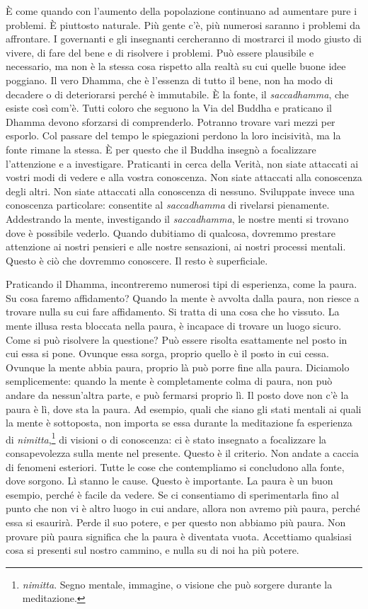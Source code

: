 È come quando con l'aumento della popolazione continuano ad aumentare
pure i problemi. È piuttosto naturale. Più gente c'è, più numerosi
saranno i problemi da affrontare. I governanti e gli insegnanti
cercheranno di mostrarci il modo giusto di vivere, di fare del bene e di
risolvere i problemi. Può essere plausibile e necessario, ma non è la
stessa cosa rispetto alla realtà su cui quelle buone idee poggiano. Il
vero Dhamma, che è l'essenza di tutto il bene, non ha modo di decadere o
di deteriorarsi perché è immutabile. È la fonte, il \emph{saccadhamma},
che esiste così com'è. Tutti coloro che seguono la Via del Buddha e
praticano il Dhamma devono sforzarsi di comprenderlo. Potranno trovare
vari mezzi per esporlo. Col passare del tempo le spiegazioni perdono la
loro incisività, ma la fonte rimane la stessa. È per questo che il
Buddha insegnò a focalizzare l'attenzione e a investigare. Praticanti in
cerca della Verità, non siate attaccati ai vostri modi di vedere e alla
vostra conoscenza. Non siate attaccati alla conoscenza degli altri. Non
siate attaccati alla conoscenza di nessuno. Sviluppate invece una
conoscenza particolare: consentite al \emph{saccadhamma} di rivelarsi
pienamente. Addestrando la mente, investigando il \emph{saccadhamma}, le
nostre menti si trovano dove è possibile vederlo. Quando dubitiamo di
qualcosa, dovremmo prestare attenzione ai nostri pensieri e alle nostre
sensazioni, ai nostri processi mentali. Questo è ciò che dovremmo
conoscere. Il resto è superficiale.

Praticando il Dhamma, incontreremo numerosi tipi di esperienza, come la
paura. Su cosa faremo affidamento? Quando la mente è avvolta dalla
paura, non riesce a trovare nulla su cui fare affidamento. Si tratta di
una cosa che ho vissuto. La mente illusa resta bloccata nella paura, è
incapace di trovare un luogo sicuro. Come si può risolvere la questione?
Può essere risolta esattamente nel posto in cui essa si pone. Ovunque
essa sorga, proprio quello è il posto in cui cessa. Ovunque la mente
abbia paura, proprio là può porre fine alla paura. Diciamolo
semplicemente: quando la mente è completamente colma di paura, non può
andare da nessun'altra parte, e può fermarsi proprio lì. Il posto dove
non c'è la paura è lì, dove sta la paura. Ad esempio, quali che siano
gli stati mentali ai quali la mente è sottoposta, non importa se essa
durante la meditazione fa esperienza di \emph{nimitta},\footnote{\emph{nimitta}.
  Segno mentale, immagine, o visione che può sorgere durante la
  meditazione.} di visioni o di conoscenza: ci è stato insegnato a
focalizzare la consapevolezza sulla mente nel presente. Questo è il
criterio. Non andate a caccia di fenomeni esteriori. Tutte le cose che
contempliamo si concludono alla fonte, dove sorgono. Lì stanno le cause.
Questo è importante. La paura è un buon esempio, perché è facile da
vedere. Se ci consentiamo di sperimentarla fino al punto che non vi è
altro luogo in cui andare, allora non avremo più paura, perché essa si
esaurirà. Perde il suo potere, e per questo non abbiamo più paura. Non
provare più paura significa che la paura è diventata vuota. Accettiamo
qualsiasi cosa si presenti sul nostro cammino, e nulla su di noi ha più
potere.

